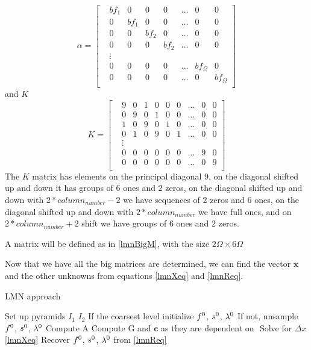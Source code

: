\documentclass[12pt,a4paper,twoside]{report}
\begin{document}
{\begin{equation}
 \alpha = \begin{bmatrix}
 &	bf_1  & 0  & 0  & 0  & \ldots & 0  & 0 \\
 &	0  & bf_1  & 0  & 0  & \ldots & 0  & 0 \\
 &			0  & 0  & bf_2  & 0  & \ldots & 0  & 0\\
 &				0  & 0  & 0  & bf_2  & \ldots & 0  & 0\\
 &				\vdots\\
& 			0 & 0  & 0  & 0  &\ldots & bf_\Omega  & 0 \\
& 				0  & 0  & 0  & 0  &\ldots & 0  & bf_\Omega\\
 \end{bmatrix}
\end{equation}
and $K$
\begin{equation}
K = \begin{bmatrix}
&	9  & 0  & 1  & 0  & 0  & 0  & \ldots & 0  & 0 \\
&	0  & 9  & 0  & 1  & 0  & 0  & \ldots & 0  & 0 \\
&	1  & 0  & 9  & 0  & 1  & 0  &\ldots & 0  & 0\\
&	0  & 1  & 0  & 9  & 0  & 1  &\ldots & 0  & 0\\
&	\vdots\\
& 	0 & 0  & 0  & 0  & 0  & 0  &\ldots &9  & 0 \\
& 	0  & 0  & 0  & 0  & 0  & 0  &\ldots & 0  & 9\\
\end{bmatrix}
\end{equation}
The $K$
 matrix has elements on the principal diagonal 9, on the diagonal shifted up and down it has groups of 6 ones and 2 zeros, on the diagonal shifted up and down with $2* column_{number}-2$ we have sequences of 2 zeros and 6 ones, on the diagonal shifted up and down with  $2* column_{number}$ we have full ones, and on $2* column_{number}+2$  shift we have groups of 6 ones and 2 zeros.
  
  A matrix will be defined as in \ref{lmnBigM}, with the size $2\Omega \times 6\Omega$
 
 Now that we have all the big matrices are determined, we can find the vector $\boldsymbol{x}$  and the other unknowns from equations \ref{lmnXeq} and \ref{lmnReq}.  


\begin{algorithm}
	\caption{LMN approach}
	\label{CHalgorithm}
	\begin{algorithmic}[1]
		\State Set up pyramids $I_1$ $I_2$
		\State If the coarsest level initialize $\boldmath{f^0}$, $\boldmath{s^0}$, $\boldmath{\lambda^0}$
		\State If not, unsample $\boldmath{f^0}$, $\boldmath{s^0}$, $\boldmath{\lambda^0}$
		\State Compute A
		\State Compute G and $\boldsymbol{c}$ as they are dependent on $\boldsymbol{}$
		\State Solve for $\Delta x$ \ref{lmnXeq}
		\State Recover $\boldmath{f^0}$, $\boldmath{s^0}$, $\boldmath{\lambda^0}$ from \ref{lmnReq}
		\EndFor
	\end{algorithmic}
\end{algorithm}


}
\end{document}
